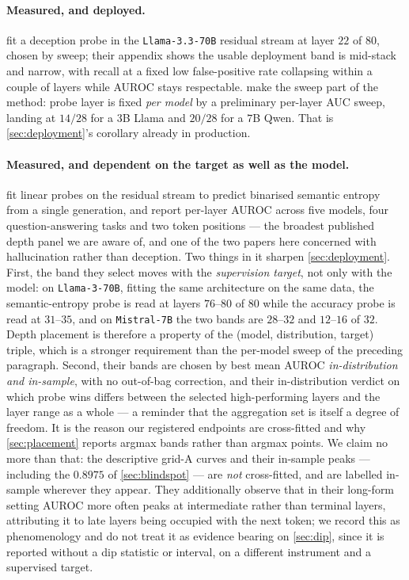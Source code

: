 \documentclass[10pt, letterpaper]{article}
\begin{document}
\paragraph{Measured, and deployed.} \citet{apollo2025probes} fit a deception probe in the
\texttt{Llama-3.3-70B} residual stream at layer $22$ of $80$, chosen by sweep; their appendix
shows the usable deployment band is mid-stack and narrow, with recall at a fixed low
false-positive rate collapsing within a couple of layers while AUROC stays respectable.
\citet{ruan2026abort} make the sweep part of the method: probe layer is fixed \emph{per model} by
a preliminary per-layer AUC sweep, landing at $14/28$ for a $3$B Llama and $20/28$ for a $7$B
Qwen. That is \cref{sec:deployment}'s corollary already in production.

\paragraph{Measured, and dependent on the target as well as the model.}
\citet{kossen2024sep} fit linear probes on the residual stream to predict binarised semantic
entropy from a single generation, and report per-layer AUROC across five models, four
question-answering tasks and two token positions --- the broadest published depth panel we are
aware of, and one of the two papers here concerned with hallucination rather than deception. Two
things in it sharpen \cref{sec:deployment}. First, the band they select moves with the
\emph{supervision target}, not only with the model: on \texttt{Llama-3-70B}, fitting the same
architecture on the same data, the semantic-entropy probe is read at layers $76$--$80$ of $80$
while the accuracy probe is read at $31$--$35$, and on \texttt{Mistral-7B} the two bands are
$28$--$32$ and $12$--$16$ of $32$. Depth placement is therefore a property of the
(model, distribution, target) triple, which is a stronger requirement than the per-model sweep
of the preceding paragraph. Second, their bands are chosen by best mean AUROC
\emph{in-distribution and in-sample}, with no out-of-bag correction, and their
in-distribution verdict on which probe wins differs between the selected high-performing layers
and the layer range as a whole --- a reminder that the aggregation set is itself a degree of
freedom. It is the reason our registered endpoints are cross-fitted and why
\cref{sec:placement} reports argmax bands rather than argmax points. We claim no more than
that: the descriptive grid-A curves and their in-sample peaks --- including the $0.8975$
of \cref{sec:blindspot} --- are \emph{not} cross-fitted, and are labelled in-sample wherever
they appear. They additionally observe
that in their long-form setting AUROC more often peaks at intermediate rather than terminal
layers, attributing it to late layers being occupied with the next token; we record this as
phenomenology and do not treat it as evidence bearing on \cref{sec:dip}, since it is reported
without a dip statistic or interval, on a different instrument and a supervised target.
\end{document}
